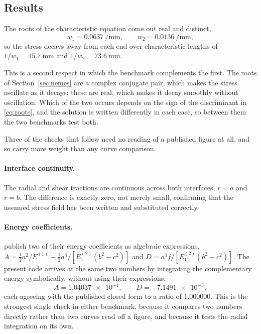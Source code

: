 \subsection{Results}
\label{sec:hassresults}
 
The roots of the characteristic equation come out real and distinct,
\begin{equation}
\label{eq:hassroots}
w_1 = \SI{0.0637}{\per\milli\metre}, \qquad
w_2 = \SI{0.0136}{\per\milli\metre},
\end{equation}
so the stress decays away from each end over characteristic lengths of
$1/w_1 = \SI{15.7}{\milli\metre}$ and $1/w_2 = \SI{73.6}{\milli\metre}$.
 
This is a second respect in which the benchmark complements the first. The
roots of Section~\ref{sec:nemes} are a complex conjugate pair, which makes
the stress oscillate as it decays; these are real, which makes it decay
smoothly without oscillation. Which of the two occurs depends on the sign of
the discriminant in \eqref{eq:roots}, and the solution is written
differently in each case, so between them the two benchmarks test both.
 
Three of the checks that follow need no reading of a published figure at
all, and so carry more weight than any curve comparison.
 
\paragraph{Interface continuity.} The radial and shear tractions are
continuous across both interfaces, $r = a$ and $r = b$. The difference is
exactly zero, not merely small, confirming that the assumed stress field has
been written and substituted correctly.
 
\paragraph{Energy coefficients.}
\textcite{hassaniehGluedinrodTimberJoints2018} publish two of their energy
coefficients as algebraic expressions,
$A = \tfrac{1}{2}a^2/E^{(1)} - \tfrac{1}{2}a^4/[E_1^{(2)}(b^2-c^2)]$ and
$D = a^4 f/[E_1^{(2)}(b^2-c^2)]$. The present code arrives at the same two
numbers by integrating the complementary energy symbolically, without using
their expressions:
\begin{equation}
\label{eq:hasscoeff}
A = \num{1.04037e-4}, \qquad
D = \num{-7.1491e-3},
\end{equation}
each agreeing with the published closed form to a ratio of $1.000000$. This
is the strongest single check in either benchmark, because it compares two
numbers directly rather than two curves read off a figure, and because it
tests the radial integration on its own.
 
